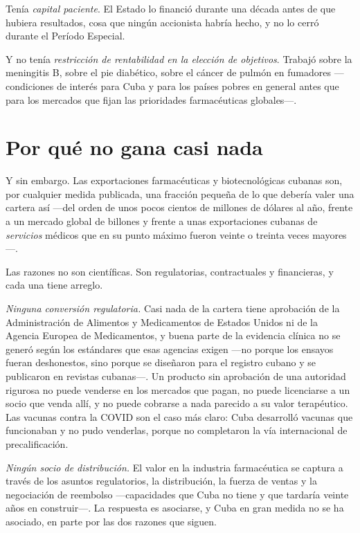 Tenía \emph{capital paciente}. El Estado lo financió durante una década antes de que hubiera
resultados, cosa que ningún accionista habría hecho, y no lo cerró durante el Período
Especial.

Y no tenía \emph{restricción de rentabilidad en la elección de objetivos}. Trabajó sobre la
meningitis B, sobre el pie diabético, sobre el cáncer de pulmón en fumadores ---condiciones
de interés para Cuba y para los países pobres en general antes que para los mercados que
fijan las prioridades farmacéuticas globales---.

\section{Por qué no gana casi nada}

Y sin embargo. Las exportaciones farmacéuticas y biotecnológicas cubanas son, por cualquier
medida publicada, una fracción pequeña de lo que debería valer una cartera así ---del orden
de unos pocos cientos de millones de dólares al año, frente a un mercado global de billones
y frente a unas exportaciones cubanas de \emph{servicios} médicos que en su punto máximo
fueron veinte o treinta veces mayores---.\unv{}

Las razones no son científicas. Son regulatorias, contractuales y financieras, y cada una
tiene arreglo.

\emph{Ninguna conversión regulatoria.} Casi nada de la cartera tiene aprobación de la
Administración de Alimentos y Medicamentos de Estados Unidos ni de la Agencia Europea de
Medicamentos, y buena parte de la evidencia clínica no se generó según los estándares que
esas agencias exigen ---no porque los ensayos fueran deshonestos, sino porque se diseñaron
para el registro cubano y se publicaron en revistas cubanas---. Un producto sin aprobación de
una autoridad rigurosa no puede venderse en los mercados que pagan, no puede licenciarse a un
socio que venda allí, y no puede cobrarse a nada parecido a su valor terapéutico. Las vacunas
contra la COVID son el caso más claro: Cuba desarrolló vacunas que funcionaban y no pudo
venderlas, porque no completaron la vía internacional de precalificación.

\emph{Ningún socio de distribución.} El valor en la industria farmacéutica se captura a
través de los asuntos regulatorios, la distribución, la fuerza de ventas y la negociación de
reembolso ---capacidades que Cuba no tiene y que tardaría veinte años en construir---. La
respuesta es asociarse, y Cuba en gran medida no se ha asociado, en parte por las dos razones
que siguen.

